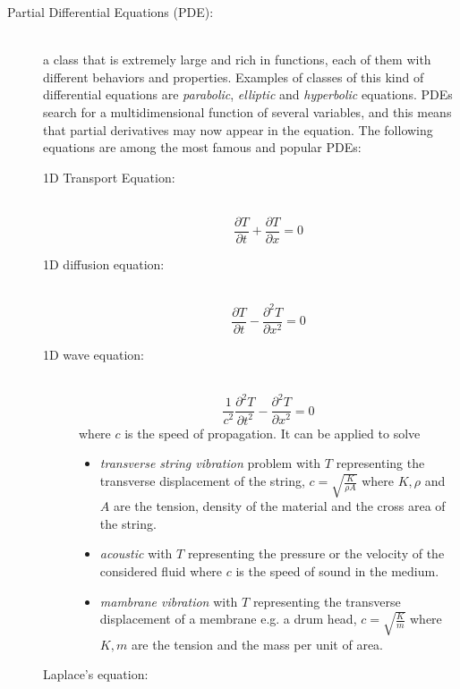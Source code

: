\begin{description}
\item [Partial Differential Equations (PDE):] \hfil \\ a class that is extremely large and rich in functions, each of them with different behaviors and properties. Examples of classes of this kind of differential equations are \textit{parabolic}, \textit{elliptic} and \textit{hyperbolic} equations. PDEs search for a multidimensional function of several variables, and this means that partial derivatives may now appear in the equation. 
The following equations are among the most famous and popular PDEs:
   \begin{description}
     \item [1D Transport Equation:] \hfil \\
     \begin{equation}
		\frac{\partial T}{\partial t} + \frac{\partial T}{\partial x} =0
     \end{equation}
     \item [1D diffusion equation:]\hfil \\ 
     \begin{equation}
     	\frac{\partial T}{\partial t} - \frac{\partial^2 T}{\partial x^2}=0
     \end{equation} 
     \item [1D wave equation:]\hfil \\  
     	\begin{equation}
     	\frac{1}{c^2}\frac{\partial^2 T}{\partial t^2} -\frac{\partial^2 T}{\partial x^2}=0
     	\label{eq:1dwave_equation}
     	\end{equation}
     	where $c$ is the speed of propagation. It can be applied to solve
     	\begin{itemize}
			\item \textit{transverse string vibration} problem with $T$ representing the transverse displacement of the string, $c=\sqrt{\frac{K}{\rho A}}$ where $K,\rho$ and $A$ are the tension, density of the material and the cross area of the string.
			\item \textit{acoustic} with $T$ representing the pressure or the velocity of the considered fluid where $c$ is the speed of sound in the medium.
			\item \textit{mambrane vibration}  with $T$ representing the transverse displacement of a membrane e.g. a drum head, $c=\sqrt{\frac{K}{m}}$ where $K,m$ are the tension and the mass per unit of area.
     	\end{itemize} 
     \item [Laplace's equation:]\hfil \\  

\end{description}
\end{description}
